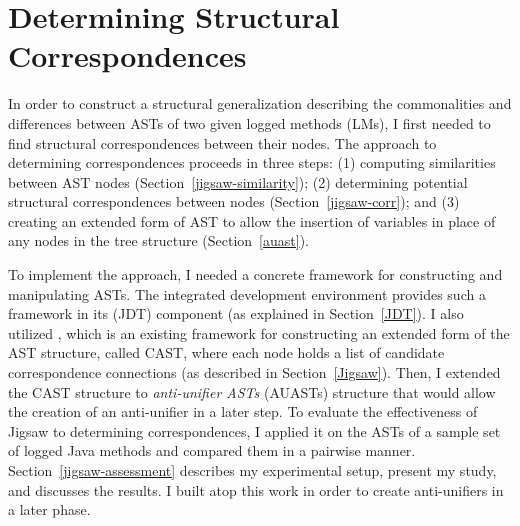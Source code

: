 \chapter{Determining Structural Correspondences}\label{background2}
In order to construct a structural generalization describing the commonalities and differences between ASTs of two given logged methods (LMs), I first needed to find structural correspondences between their nodes. The approach to determining correspondences proceeds in three steps: (1) computing similarities between AST nodes (Section~\ref{jigsaw-similarity}); (2) determining potential structural correspondences between nodes (Section~\ref{jigsaw-corr}); and (3) creating an extended form of AST to allow the insertion of variables in place of any nodes in the tree structure (Section~\ref{auast}).


To implement the approach, I needed a concrete framework for constructing and manipulating ASTs. The  integrated development environment provides such a framework in its  (JDT) component (as explained in Section~\ref{JDT}). I also utilized  \cite{2008:fse:cottrell}, which is an existing framework for constructing an extended form of the AST structure, called CAST, where each node holds a list of candidate correspondence connections (as described in Section~\ref{Jigsaw}). Then, I extended the CAST structure to \emph{anti-unifier ASTs} (AUASTs) structure that would allow the creation of an anti-unifier in a later step. To evaluate the effectiveness of Jigsaw to determining correspondences, I applied it on the ASTs of a sample set of logged Java methods and compared them in a pairwise manner. Section~\ref{jigsaw-assessment} describes my experimental setup, present my study, and discusses the results. I built atop this work in order to create anti-unifiers in a later phase.





